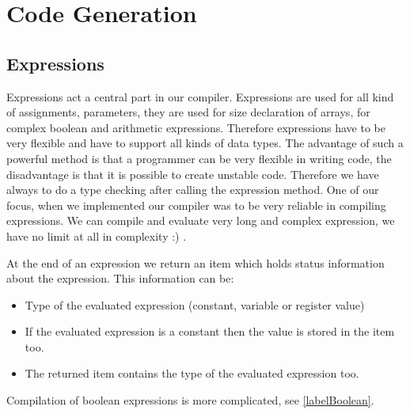 \section{Code Generation}

\subsection{Expressions}

Expressions act a central part in our compiler. Expressions are used for all kind of assignments, parameters, 
they are used for size declaration of arrays, for complex boolean and arithmetic expressions. 
Therefore expressions have to be very flexible and have to support all kinds of data types. 
The advantage of such a powerful method is that a programmer can be very flexible in writing code, 
the disadvantage is that it is possible to create unstable code. Therefore we have always to do a type checking after calling
the expression method.
One of our focus, when we implemented our compiler was to be very reliable in compiling expressions.
We can compile and evaluate very long and complex expression, we have no limit at all in complexity :) .

At the end of an expression we return an item which holds status information about the expression.
This information can be:
\begin{itemize}
  \item Type of the evaluated expression (constant, variable or register value)
  \item If the evaluated expression is a constant then the value is stored in the item too.
  \item The returned item contains the type of the evaluated expression too.
\end{itemize}
Compilation of boolean expressions is more complicated, see \ref{labelBoolean}. 

